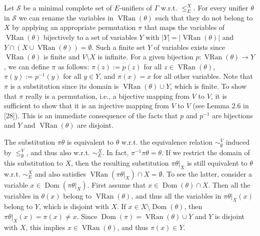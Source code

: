  
Let $\mathcal{S}$ be a minimal complete set of $E$-unifiers of $\Gamma$ w.r.t. $\leq_{E}^{X}$. For every unifier $\theta$ in $\mathcal{S}$ we can rename the variables in $\operatorname{VRan}(\theta)$ such that they do not belong to $X$ by applying an appropriate permutation $\pi$ that maps the variables of $\operatorname{VRan}(\theta)$ bijectively to a set of variables $Y$ with $|Y|=|\operatorname{VRan}(\theta)|$ and $Y\cap(X\cup\operatorname{VRan}(\theta))=\emptyset$. Such a finite set $Y$ of variables exists since $\operatorname{VRan}(\theta)$ is finite and $V\setminus X$ is infinite. For a given bijection $p:\operatorname{VRan}(\theta)\rightarrow Y$, we can define $\pi$ as follows: $\pi(z):=p(z)$ for all $z\in\operatorname{VRan}(\theta)$, $\pi(y):=p^{-1}(y)$ for all $y\in Y$, and $\pi(x)=x$ for all other variables. Note that $\pi$ is a substitution since its domain is $\operatorname{VRan}(\theta)\cup Y$, which is finite. To show that $\pi$ really is a permutation, i.e., a bijective mapping from $V$ to $V$, it is sufficient to show that it is an injective mapping from $V$ to $V$ (see Lemma 2.6 in [28]). This is an immediate consequence of the facts that $p$ and $p^{-1}$ are bijections and $Y$ and $\operatorname{VRan}(\theta)$ are disjoint.\par
 
 
 
The substitution $\pi\theta$ is equivalent to $\theta$ w.r.t. the equivalence relation $\sim_{\emptyset}^{V}$ induced by $\leq_{\emptyset}^{V}$, and thus also w.r.t. $\sim_{E}^{X}$. In fact, $\pi^{-1}\pi\theta=\theta$. If we restrict the domain of this substitution to $X$, then the resulting substitution $\pi\theta|_{X}$ is still equivalent to $\theta$ w.r.t. $\sim_{E}^{X}$ and also satisfies $\operatorname{VRan}(\pi\theta|_{X})\cap X=\emptyset$. To see the latter, consider a variable $x\in\operatorname{Dom}(\pi\theta|_{X})$. First assume that $x\in\operatorname{Dom}(\theta)\cap X$. Then all the variables in $\theta(x)$ belong to $\operatorname{VRan}(\theta)$, and thus all the variables in $\pi\theta|_{X}(x)$ belong to $Y$, which is disjoint with $X$. If $x\in X\setminus\operatorname{Dom}(\theta)$, then $\pi\theta|_{X}(x)=\pi(x)\neq x$. Since $\operatorname{Dom}(\pi)=\operatorname{VRan}(\theta)\cup Y$ and $Y$ is disjoint with $X$, this implies $x\in\operatorname{VRan}(\theta)$, and thus $\pi(x)\in Y$.\par
 
